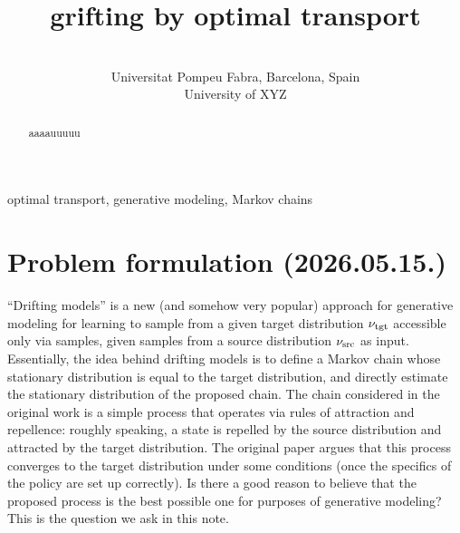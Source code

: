 \documentclass[twoside,10pt]{../jmlr}
\title{grifting by optimal transport}
\author{
 \Name[{Gergely~Neu}]{Gergely Neu} \Email{gergely.neu@gmail.com}\\
 \addr Universitat Pompeu Fabra, Barcelona, Spain
 \AND
 \Name{(add-your-name)} \Email{add-your-email@gmail.com}\\
 \addr University of XYZ
 }
\begin{document}
\maketitle

\begin{abstract}
aaaauuuuu
\end{abstract}

\begin{keywords}%
  optimal transport, generative modeling, Markov chains
\end{keywords}


\section{Problem formulation (2026.05.15.)}
``Drifting models'' is a new (and somehow very popular) approach for generative modeling for learning 
to sample from a given target distribution $\nu_{\text{tgt}}$ accessible only via samples, given samples from a source distribution 
$\nu_{\text{src}}$ as input. Essentially, the idea behind drifting models is to define a Markov chain whose stationary distribution 
is equal to the target distribution, and directly estimate the stationary distribution of the proposed chain. The chain 
considered in the original work is a simple process that operates via rules of attraction and repellence: roughly 
speaking, a state is repelled by the source distribution and attracted by the target distribution. The original paper 
argues that this process converges to the target distribution under some conditions (once the specifics of the policy 
are set up correctly). Is there a good reason to believe that the proposed process is the best possible one for 
purposes of generative modeling? This is the question we ask in this note.
\end{document}
